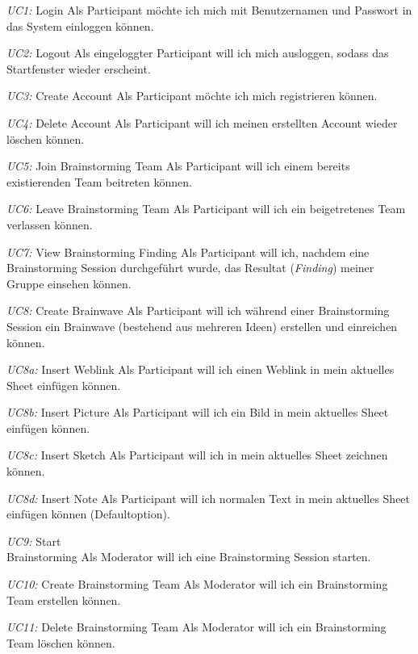 \begin{basedescript}{
		\desclabelstyle{\multilinelabel}
		\desclabelwidth{4.5cm}
		\setlength{\itemsep}{5ex}}
	\item[\textit{UC1: }Login] Als Participant möchte ich mich mit Benutzernamen und Passwort in das System einloggen können.
	
	\item[\textit{UC2: }Logout] Als eingeloggter Participant will ich mich ausloggen, sodass das Startfenster wieder erscheint.
	
	\item[\textit{UC3: }Create Account] Als Participant möchte ich mich registrieren können.
	
	\item[\textit{UC4: }Delete Account] Als Participant will ich meinen erstellten Account wieder löschen können.
	
	\item[\textit{UC5: }Join Brainstorming Team] Als Participant will ich einem bereits existierenden Team beitreten können.
	
	\item[\textit{UC6: }Leave Brainstorming Team] Als Participant will ich ein beigetretenes Team verlassen können.
	
	\item[\textit{UC7: }View Brainstorming Finding] Als Participant will ich, nachdem eine Brainstorming Session durchgeführt wurde, das Resultat (\textit{Finding}) meiner Gruppe einsehen können.
	
	\item[\textit{UC8: }Create Brainwave] Als Participant will ich während einer Brainstorming Session ein Brainwave (bestehend aus mehreren Ideen) erstellen und einreichen können. 
	
	\item[\textit{UC8a: }Insert Weblink] Als Participant will ich einen Weblink in mein aktuelles Sheet einfügen können.
	
	\item[\textit{UC8b: }Insert Picture] Als Participant will ich ein Bild in mein aktuelles Sheet einfügen können.
	
	\item[\textit{UC8c: }Insert Sketch] Als Participant will ich in mein aktuelles Sheet zeichnen können.
	
	\item[\textit{UC8d: }Insert Note] Als Participant will ich normalen Text in mein aktuelles Sheet einfügen können (Defaultoption).
	
	\item[\textit{UC9: }Start \\Brainstorming] Als Moderator will ich eine Brainstorming Session starten.
	
	\item[\textit{UC10: }Create Brainstorming Team] Als Moderator will ich 
	ein Brainstorming Team erstellen können. 
	
	\item[\textit{UC11: }Delete Brainstorming Team] Als Moderator will ich ein Brainstorming Team löschen können.
\end{basedescript}
\vspace{1cm}

